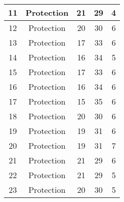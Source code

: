 \documentclass[results.tex]{subfiles}
\begin{document}
\begin{center}
\begin{tabular}{| c || c | c | c | c |}
            \hline
            11                      & Protection                   & 21                     & 29                      & 4                    \\
            \hline
            12                      & Protection                   & 20                     & 30                      & 6                    \\
            \hline
            13                      & Protection                   & 17                     & 33                      & 6                    \\
            \hline
            14                      & Protection                   & 16                     & 34                      & 5                    \\
            \hline
            15                      & Protection                   & 17                     & 33                      & 6                    \\
            \hline
            16                      & Protection                   & 16                     & 34                      & 6                    \\
            \hline
            17                      & Protection                   & 15                     & 35                      & 6                    \\
            \hline
            18                      & Protection                   & 20                     & 30                      & 6                    \\
            \hline
            19                      & Protection                   & 19                     & 31                      & 6                    \\
            \hline
            20                      & Protection                   & 19                     & 31                      & 7                    \\
            \hline
            21                      & Protection                   & 21                     & 29                      & 6                    \\
            \hline
            22                      & Protection                   & 21                     & 29                      & 5                    \\
            \hline
            23                      & Protection                   & 20                     & 30                      & 5                    \\

\end{tabular}
\end{center}
\end{document}
